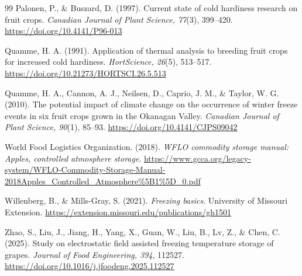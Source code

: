 \begin{thebibliography}{99}
Palonen, P., \& Buszard, D. (1997). Current state of cold hardiness research on fruit crops. \emph{Canadian Journal of Plant Science, 77}(3), 399--420. \url{https://doi.org/10.4141/P96-013}

Quamme, H. A. (1991). Application of thermal analysis to breeding fruit crops for increased cold hardiness. \emph{HortScience, 26}(5), 513--517. \url{https://doi.org/10.21273/HORTSCI.26.5.513}

Quamme, H. A., Cannon, A. J., Neilsen, D., Caprio, J. M., \& Taylor, W. G. (2010). The potential impact of climate change on the occurrence of winter freeze events in six fruit crops grown in the Okanagan Valley. \emph{Canadian Journal of Plant Science, 90}(1), 85--93. \url{https://doi.org/10.4141/CJPS09042}

World Food Logistics Organization. (2018). \emph{WFLO commodity storage manual: Apples, controlled atmosphere storage}. \url{https://www.gcca.org/legacy-system/WFLO-Commodity-Storage-Manual-2018Apples_Controlled_Atmosphere%5B1%5D_0.pdf}

Willenberg, B., \& Mills-Gray, S. (2021). \emph{Freezing basics}. University of Missouri Extension. \url{https://extension.missouri.edu/publications/gh1501}

Zhao, S., Liu, J., Jiang, H., Yang, X., Guan, W., Liu, B., Lv, Z., \& Chen, C. (2025). Study on electrostatic field assisted freezing temperature storage of grapes. \emph{Journal of Food Engineering, 394}, 112527. \url{https://doi.org/10.1016/j.jfoodeng.2025.112527}

\end{thebibliography}

